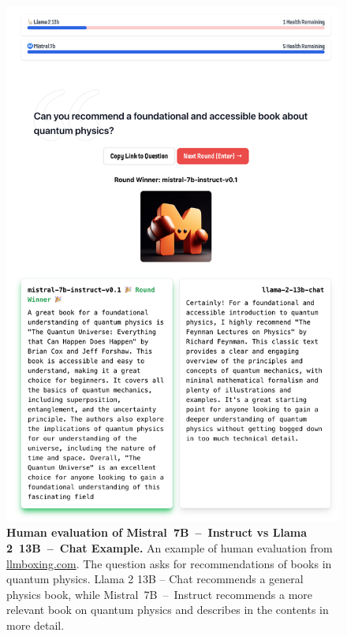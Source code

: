 \documentclass{article}
\def\llama{Llama\xspace}
\def\mistralchat{Mistral~7B~--~Instruct\xspace}
\begin{document}
\begin{figure}
\centering
\includegraphics[width=1.0\linewidth,keepaspectratio]{images/llama_vs_mistral_example.png}
\vspace{-10pt}
\caption{\small \textbf{Human evaluation of \mistralchat vs \llama 2~13B~--~Chat Example.} An example of human evaluation from \url{llmboxing.com}. The question asks for recommendations of books in quantum physics. \llama 2 13B -- Chat recommends a general physics book, while \mistralchat recommends a more relevant book on quantum physics and describes in the contents in more detail.}
\label{fig:humanevalquestion}
\end{figure}

\pagebreak 


\end{document}
